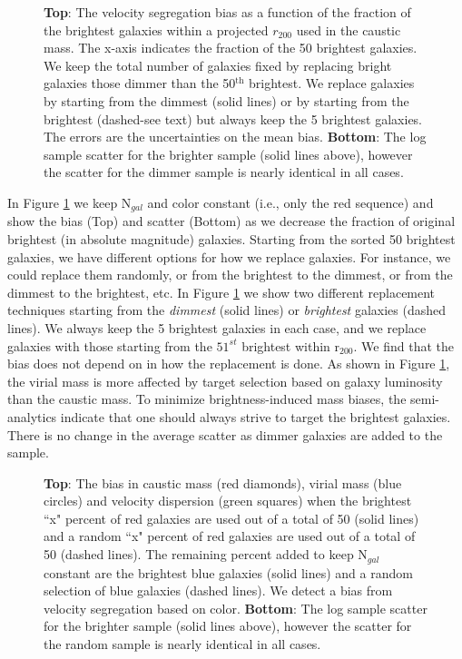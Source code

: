 \documentclass[iop]{emulateapj}
\begin{document}
\begin{figure}
\caption{{\bf Top}: The velocity segregation bias as a function of the fraction of the brightest galaxies within a projected $r_{200}$ used in the caustic mass. The x-axis indicates the fraction of the 50 brightest galaxies. We keep the total number of galaxies fixed by replacing bright galaxies those dimmer than the 50$^{\textrm{th}}$ brightest. We replace galaxies by starting from the dimmest (solid lines) or by starting from the brightest (dashed-see text) but always keep the 5 brightest galaxies. The errors are the uncertainties on the mean bias. {\bf Bottom}: The log sample scatter for the brighter sample (solid lines above), however the scatter for the dimmer sample is nearly identical in all cases. \label{fig:bias_vs_bright}}
\end{figure}

In Figure \ref{fig:bias_vs_bright} we keep N$_{gal}$ and color constant (i.e., only the red sequence) and show the bias (Top) and scatter (Bottom) as we decrease the fraction of original brightest (in absolute magnitude) galaxies. Starting from the sorted 50 brightest galaxies, we have different options for how we replace galaxies. For instance, we could replace them randomly, or from the brightest to the dimmest, or from the dimmest to the brightest, etc. In Figure \ref{fig:bias_vs_bright} we show two different replacement techniques starting from the \emph{dimmest} (solid lines) or  \emph{brightest} galaxies (dashed lines). We always keep the 5 brightest galaxies in each case, and we replace galaxies with those starting from the $51^{st}$ brightest within r$_{200}$. We find that the bias does not depend on in how the replacement is done. As shown in Figure \ref{fig:bias_vs_bright}, the virial mass is more affected by target selection based on galaxy luminosity than the caustic mass. To minimize brightness-induced mass biases, the \citet{Guo11} semi-analytics indicate that one should always strive to target the brightest galaxies. There is no change in the average scatter as dimmer galaxies are added to the sample.

\begin{figure}
\caption{{\bf Top}: The bias in caustic mass (red diamonds), virial mass (blue circles) and velocity dispersion (green squares) when the brightest ``x" percent of red galaxies are used out of a total of 50 (solid lines) and a random ``x" percent of red galaxies are used out of a total of 50 (dashed lines). The remaining percent added to keep N$_{gal}$ constant are the brightest blue galaxies (solid lines) and a random selection of blue galaxies (dashed lines). We detect a bias from velocity segregation based on color. {\bf Bottom}: The log sample scatter for the brighter sample (solid lines above), however the scatter for the random sample is nearly identical in all cases.}
\label{fig:red_bias_vs_red}
\end{figure}
\end{document}
